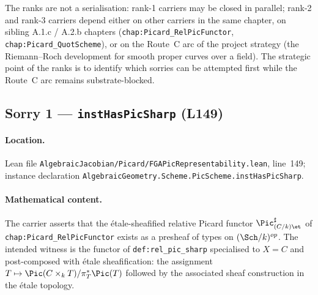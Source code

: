 \medskip

The ranks are not a serialisation: rank-1 carriers may be closed in
parallel; rank-2 and rank-3 carriers depend either on other carriers
in the same chapter, on sibling A.1.c / A.2.b chapters
(\texttt{chap:Picard\_RelPicFunctor},
\texttt{chap:Picard\_QuotScheme}), or on the Route~C arc of the project
strategy (the Riemann--Roch development for smooth proper curves over
a field). The strategic point of the ranks is to identify which
sorries can be attempted first while the Route~C arc remains
substrate-blocked.

\subsection{Sorry 1 --- \texttt{instHasPicSharp} (L149)}
\label{subsec:sorry_has_pic_sharp}

\paragraph{Location.} Lean file
\texttt{AlgebraicJacobian/Picard/FGAPicRepresentability.lean},
line~149; instance declaration
\texttt{AlgebraicGeometry.Scheme.PicScheme.instHasPicSharp}.

\paragraph{Mathematical content.} The carrier asserts that the
\'etale-sheafified relative Picard functor $\Pic^\sharp_{(C/k)\et}$ of
\texttt{chap:Picard\_RelPicFunctor} exists as a presheaf of types on
$(\Sch/k)^{op}$. The intended witness is the functor of \texttt{def:rel\_pic\_sharp}
specialised to $X = C$ and post-composed with \'etale sheafification:
the assignment $T \mapsto \Pic(C \times_k T) / \pi_T^* \Pic(T)$
followed by the associated sheaf construction in the \'etale topology.

